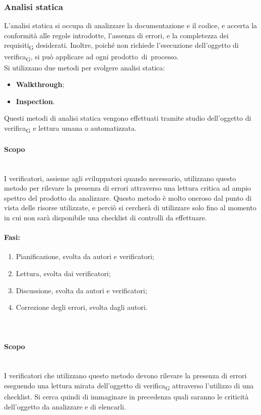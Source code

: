 \subsubsection{Analisi statica}
L’analisi statica si occupa di analizzare la documentazione e il codice, e accerta la conformità alle regole introdotte, l'assenza di errori, e la completezza dei requisiti\textsubscript{G} desiderati. Inoltre, poiché non richiede l’esecuzione dell’oggetto di verifica\textsubscript{G}, si può applicare ad ogni prodotto di processo.\\
Si utilizzano due metodi per svolgere analisi statica:
\begin{itemize}
	\item \textbf{Walkthrough};
	\item \textbf{Inspection}.
\end{itemize}
Questi metodi di analisi statica vengono effettuati tramite studio dell’oggetto di verifica\textsubscript{G} e lettura umana o automatizzata.
\paragraph {Scopo}\mbox{}\\
I verificatori, assieme agli sviluppatori quando necessario, utilizzano questo metodo per rilevare la presenza di errori attraverso una lettura critica ad ampio spettro del prodotto da analizzare. Questo metodo è molto oneroso dal punto di vista delle risorse utilizzate, e perciò si cercherà di utilizzare solo fino al momento in cui non sarà disponibile una checklist di controlli da effettuare.
\paragraph {Fasi:}\:
\begin{enumerate}
	\item Pianificazione, svolta da autori e verificatori;
	\item Lettura, svolta dai verificatori;
	\item Discussione, svolta da autori e verificatori;
	\item Correzione degli errori, svolta dagli autori.
\end{enumerate}
\paragraph {}\mbox{}\\
\paragraph {Scopo}\mbox{}\\
I verificatori che utilizzano questo metodo devono rilevare la presenza di errori eseguendo una lettura mirata dell’oggetto di verifica\textsubscript{G} attraverso l'utilizzo di una checklist. Si cerca quindi di immaginare in precedenza quali saranno le criticità dell'oggetto da analizzare e di elencarli.
